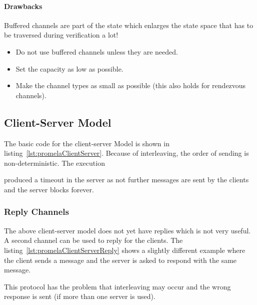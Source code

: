 \documentclass[a4paper, 11pt, accentcolor = tud3b]{tudreport}
\newcommand{\outputlisting}[1]{}
\begin{document}
					\paragraph{Drawbacks}
						Buffered channels are part of the state which enlarges the state space that has to be traversed during verification a lot!
						
						\begin{itemize}
							\item Do not use buffered channels unless they are needed.
							\item Set the capacity as low as possible.
							\item Make the channel types as small as possible (this also holds for rendezvous channels).
						\end{itemize}

			\subsection{Client-Server Model}
				
			
				The basic code for the client-server Model is shown in listing~\ref{lst:promelaClientServer}. Because of interleaving, the order of sending is non-deterministic. The execution
				\outputlisting{code/promela/client-server.pml.out}
				produced a timeout in the server as not further messages are sent by the clients and the server blocks forever.

				\subsubsection{Reply Channels}
					
				
					The above client-server model does not yet have replies which is not very useful. A second channel can be used to reply for the clients. The listing~\ref{lst:promelaClientServerReply} shows a slightly different example where the client sends a message and the server is asked to respond with the same message.
					
					This protocol has the problem that interleaving may occur and the wrong response is sent (if more than one server is used).
\end{document}
